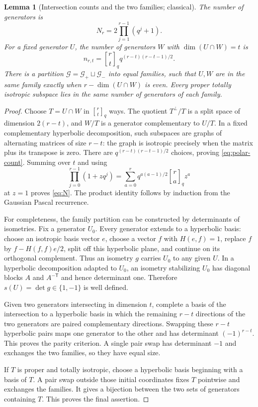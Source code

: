 \documentclass[11pt,a4paper]{article}
\newtheorem{lemma}[theorem]{Lemma}
\theoremstyle{definition}
\theoremstyle{remark}
\newcommand{\G}{\mathcal G}
\newcommand{\gb}[2]{\genfrac{[}{]}{0pt}{}{#1}{#2}_{q}}
\begin{document}
\begin{lemma}[Intersection counts and the two families; classical]
\label{lem:polar-geometry}
The number of generators is
\begin{equation}\label{eq:N}
 N_r=2\prod_{j=1}^{r-1}(q^j+1).
\end{equation}
For a fixed generator $U$, the number of generators $W$ with
$\dim(U\cap W)=t$ is
\begin{equation}\label{eq:polar-count}
 n_{r,t}=\gb rt q^{(r-t)(r-t-1)/2}.
\end{equation}
There is a partition $\G=\G_+\sqcup\G_-$ into equal families, such that
$U,W$ are in the same family exactly when $r-\dim(U\cap W)$ is even.
Every proper totally isotropic subspace lies in the same number of
generators of each family.
\end{lemma}
\begin{proof}
Choose $T=U\cap W$ in $\gb rt$ ways. The quotient $T^\perp/T$ is a
split space of dimension $2(r-t)$, and $W/T$ is a generator complementary
to $U/T$. In a fixed complementary hyperbolic decomposition, such
subspaces are graphs of alternating matrices of size $r-t$: the graph
is isotropic precisely when the matrix plus its transpose is zero.
There are $q^{(r-t)(r-t-1)/2}$ choices, proving \eqref{eq:polar-count}.
Summing over $t$ and using
\[
 \prod_{j=0}^{r-1}(1+zq^j)
 =\sum_{a=0}^r q^{a(a-1)/2}\gb ra z^a
\]
at $z=1$ proves \eqref{eq:N}. The product identity follows by induction
from the Gaussian Pascal recurrence.

For completeness, the family partition can be constructed by determinants
of isometries. Fix a generator $U_0$. Every generator extends to a
hyperbolic basis: choose an isotropic basis vector $e$, choose a vector
$f$ with $H(e,f)=1$, replace $f$ by $f-H(f,f)e/2$, split off this
hyperbolic plane, and continue on its orthogonal complement. Thus an
isometry $g$ carries $U_0$ to any given $U$. In a hyperbolic decomposition
adapted to $U_0$, an isometry stabilizing $U_0$ has diagonal blocks
$A$ and $A^{-\mathsf T}$ and hence determinant one. Therefore
$s(U)=\det g\in\{1,-1\}$ is well defined.

Given two generators intersecting in dimension $t$, complete a basis of
the intersection to a hyperbolic basis in which the remaining $r-t$
directions of the two generators are paired complementary directions.
Swapping these $r-t$ hyperbolic pairs maps one generator to the other
and has determinant $(-1)^{r-t}$. This proves the parity criterion.
A single pair swap has determinant $-1$ and exchanges the two families,
so they have equal size.

If $T$ is proper and totally isotropic, choose a hyperbolic basis beginning
with a basis of $T$. A pair swap outside those initial coordinates fixes
$T$ pointwise and exchanges the families. It gives a bijection between
the two sets of generators containing $T$. This proves the final assertion.
\end{proof}
\end{document}
